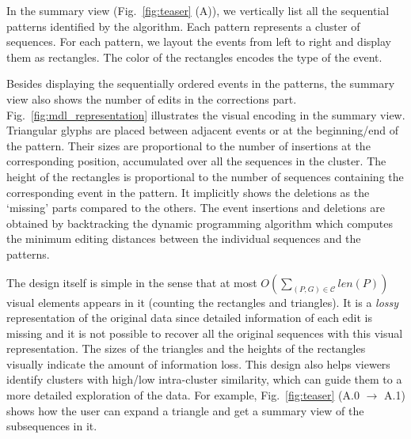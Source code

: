 In the summary view (Fig.~\ref{fig:teaser} (A)), we vertically list all the sequential patterns identified by the algorithm. Each pattern represents a cluster of sequences. For each pattern, we layout the events from left to right and display them as rectangles. The color of the rectangles encodes the type of the event. 

Besides displaying the sequentially ordered events in the patterns, the summary view also shows the number of edits in the corrections part. Fig.~\ref{fig:mdl_representation} illustrates the visual encoding in the summary view. Triangular glyphs are placed between adjacent events or at the beginning/end of the pattern. Their sizes are proportional to the number of insertions at the corresponding position, accumulated over all the sequences in the cluster. The height of the rectangles is proportional to the number of sequences containing the corresponding event in the pattern. It implicitly shows the deletions as the `missing' parts compared to the others. The event insertions and deletions are obtained by backtracking the dynamic programming algorithm which computes the minimum editing distances between the individual sequences and the patterns.

The design itself is simple in the sense that at most $O(\sum_{(P, G) \in \mathscr{C}}len(P))$ visual elements appears in it (counting the rectangles and triangles). It is a \textit{lossy} representation of the original data since detailed information of each edit is missing and it is not possible to recover all the original sequences with this visual representation. The sizes of the triangles and the heights of the rectangles visually indicate the amount of information loss. This design also helps viewers identify clusters with high/low intra-cluster similarity, which can guide them to a more detailed exploration of the data. For example, Fig.~\ref{fig:teaser} (A.0 $\rightarrow$ A.1) shows how the user can expand a triangle and get a summary view of the subsequences in it. 


